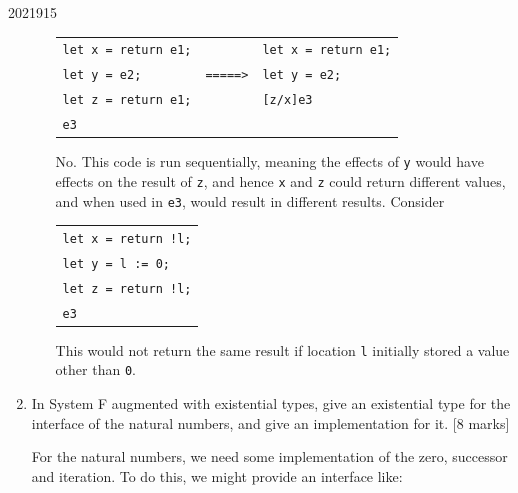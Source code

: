 \documentclass[10pt,\jkfside,a4paper]{article}
\newcommand{\answer}[1]{
    \begin{tcolorbox}[colframe=black, colback=white, sharp corners, boxrule=0.2mm, breakable]
        #1
    \end{tcolorbox}
}
\newcommand{\qmarks}[1]{\hspace*{\fill}[#1]}
\begin{document}
\begin{examquestion}{2021}{9}{15}
\begin{enumerate}
\begin{enumerate}
                    \begin{center}
                        \begin{tabular}{l c l}
                            \texttt{let x = return e1;} &                 & \texttt{let x = return e1;} \\
                            \texttt{let y = e2;}        & \texttt{=====>} & \texttt{let y = e2;}        \\
                            \texttt{let z = return e1;} &                 & \texttt{[z/x]e3}            \\
                            \texttt{e3}                 &                 &
                        \end{tabular}
                    \end{center}

                    \answer{
                        No. This code is run sequentially, meaning the effects of \texttt{y} would have effects on the result of \texttt{z}, and hence \texttt{x} and \texttt{z} could return different values, and when used in \texttt{e3}, would result in different results. Consider
                        \begin{center}
                            \begin{tabular}{l}
                                \texttt{let x = return !l;} \\
                                \texttt{let y = l := 0;}    \\
                                \texttt{let z = return !l;} \\
                                \texttt{e3}
                            \end{tabular}
                        \end{center}
                        This would not return the same result if location \texttt{l} initially stored a value other than \texttt{0}.
                    }

            \end{enumerate}

        \item
            In System F augmented with existential types, give an existential type for
            the interface of the natural numbers, and give an implementation for it.
            \qmarks{8 marks}

            \answer{ 
                For the natural numbers, we need some implementation of the zero, successor and iteration. To do this, we might provide an interface like: 

}
\end{enumerate}
\end{examquestion}
\end{document}
